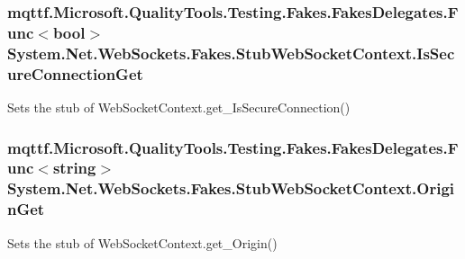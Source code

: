 \hypertarget{class_system_1_1_net_1_1_web_sockets_1_1_fakes_1_1_stub_web_socket_context_a46621c8ba9b84934837a188d6ab8aacd}{
\subsubsection[{Is\-Secure\-Connection\-Get}]{\setlength{\rightskip}{0pt plus 5cm}mqttf.\-Microsoft.\-Quality\-Tools.\-Testing.\-Fakes.\-Fakes\-Delegates.\-Func$<$bool$>$ System.\-Net.\-Web\-Sockets.\-Fakes.\-Stub\-Web\-Socket\-Context.\-Is\-Secure\-Connection\-Get}}\label{class_system_1_1_net_1_1_web_sockets_1_1_fakes_1_1_stub_web_socket_context_a46621c8ba9b84934837a188d6ab8aacd}


Sets the stub of Web\-Socket\-Context.\-get\-\_\-\-Is\-Secure\-Connection()

\hypertarget{class_system_1_1_net_1_1_web_sockets_1_1_fakes_1_1_stub_web_socket_context_a29b0e79eb4919f2f9d95970ecf72667a}{
\subsubsection[{Origin\-Get}]{\setlength{\rightskip}{0pt plus 5cm}mqttf.\-Microsoft.\-Quality\-Tools.\-Testing.\-Fakes.\-Fakes\-Delegates.\-Func$<$string$>$ System.\-Net.\-Web\-Sockets.\-Fakes.\-Stub\-Web\-Socket\-Context.\-Origin\-Get}}\label{class_system_1_1_net_1_1_web_sockets_1_1_fakes_1_1_stub_web_socket_context_a29b0e79eb4919f2f9d95970ecf72667a}


Sets the stub of Web\-Socket\-Context.\-get\-\_\-\-Origin()

